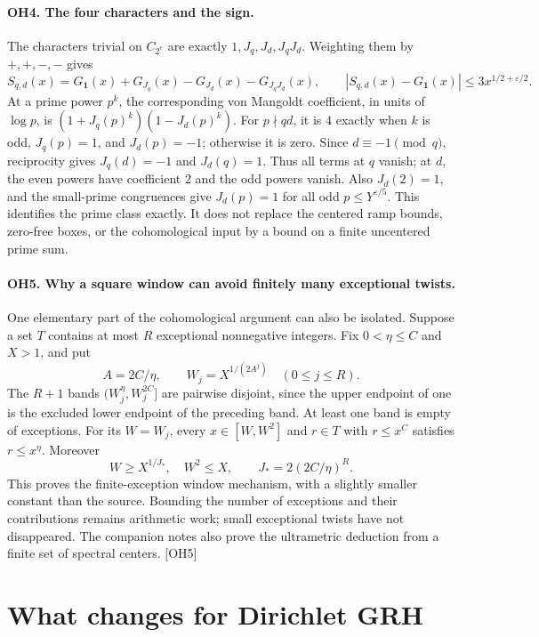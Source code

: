 \documentclass[11pt,a4paper]{article}
\numberwithin{equation}{section}
\theoremstyle{remark}\newtheorem{remark}[theorem]{Remark}
\begin{document}
\paragraph{OH4. The four characters and the sign.}
The characters trivial on $C_{2^e}$ are exactly
$1,J_q,J_d,J_qJ_d$.  Weighting them by $+,+,-,-$ gives
\[
 S_{q,d}(x)=G_{\mathbf1}(x)+G_{J_q}(x)-G_{J_d}(x)-G_{J_qJ_d}(x),
 \qquad |S_{q,d}(x)-G_{\mathbf1}(x)|\le3x^{1/2+\varepsilon/2}.
\]
At a prime power $p^k$, the corresponding von Mangoldt coefficient,
in units of $\log p$, is
$(1+J_q(p)^k)(1-J_d(p)^k)$.
For $p\nmid qd$, it is $4$ exactly when $k$ is odd,
$J_q(p)=1$, and $J_d(p)=-1$; otherwise it is zero.
Since $d\equiv-1\pmod q$, reciprocity gives $J_q(d)=-1$ and
$J_d(q)=1$.  Thus all terms at $q$ vanish; at $d$, the even powers have
coefficient $2$ and the odd powers vanish.  Also $J_d(2)=1$, and the
small-prime congruences give $J_d(p)=1$ for all odd
$p\le Y^{\varepsilon/5}$.  This identifies the prime class exactly.
It does not replace the centered ramp bounds, zero-free boxes, or the
cohomological input by a bound on a finite uncentered prime sum.

\paragraph{OH5. Why a square window can avoid finitely many exceptional twists.}
One elementary part of the cohomological argument can also be isolated. Suppose a set $T$ contains at most $R$ exceptional nonnegative integers. Fix $0<\eta\le C$ and $X>1$, and put
\[
A=2C/\eta,\qquad W_j=X^{1/(2A^j)}\quad(0\le j\le R).
\]
The $R+1$ bands $(W_j^\eta,W_j^{2C}]$ are pairwise disjoint, since the upper endpoint of one is the excluded lower endpoint of the preceding band. At least one band is empty of exceptions. For its $W=W_j$, every $x\in[W,W^2]$ and $r\in T$ with $r\le x^C$ satisfies $r\le x^\eta$. Moreover
\[
W\ge X^{1/J_*},\quad W^2\le X,\qquad J_*=2(2C/\eta)^R.
\]
This proves the finite-exception window mechanism, with a slightly smaller constant than the source. Bounding the number of exceptions and their contributions remains arithmetic work; small exceptional twists have not disappeared. The companion notes also prove the ultrametric deduction from a finite set of spectral centers. \textsf{[OH5]}



\section{What changes for Dirichlet GRH}\label{sec:grh}
\end{document}
